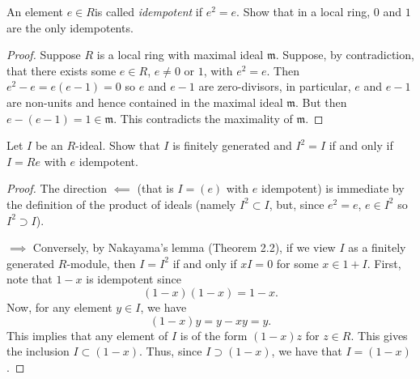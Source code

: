 \begin{problem}
An element $e\in R$is called \emph{idempotent} if $e^2=e$. Show
that in a local ring, $0$ and $1$ are the only idempotents.
\end{problem}
\begin{proof}
Suppose $R$ is a local ring with maximal ideal
$\mathfrak{m}$. Suppose, by contradiction, that there exists some
$e\in R$, $e\neq 0$ or $1$, with $e^2=e$. Then $e^2-e=e(e-1)=0$
so $e$ and $e-1$ are zero-divisors, in particular, $e$ and $e-1$
are non-units and hence contained in the maximal ideal
$\mathfrak{m}$. But then $e-(e-1)=1\in\mathfrak{m}$. This
contradicts the maximality of $\mathfrak{m}$.
\end{proof}
\newpage
\begin{problem}
Let $I$ be an $R$-ideal. Show that $I$ is finitely generated and
$I^2=I$ if and only if $I=Re$ with $e$ idempotent.
\end{problem}
\begin{proof}
The direction $\impliedby$ (that is $I=(e)$ with $e$ idempotent)
is immediate by the definition of the product of ideals (namely
$I^2\subset I$, but, since $e^2=e$, $e\in I^2$ so $I^2\supset
I$).

$\implies$ Conversely, by Nakayama's lemma (Theorem 2.2), if we view
$I$ as a finitely generated $R$-module, then $I=I^2$ if and only
if $xI=0$ for some $x\in 1+I$. First, note that $1-x$ is
idempotent since
\[
(1-x)(1-x)=1-x.
\]
Now, for any element $y\in I$, we have
\[
(1-x)y=y-xy=y.
\]
This implies that any element of $I$ is of the form $(1-x)z$ for
$z\in R$. This gives the inclusion $I\subset (1-x)$. Thus, since
$I\supset (1-x)$, we have that $I=(1-x)$.
\end{proof}

